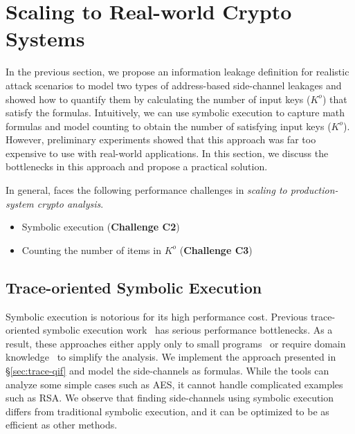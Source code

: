 \section{Scaling to Real-world Crypto Systems}
\label{sec:scala}

In the previous section, we propose an information leakage definition for
realistic attack scenarios to model two types of address-based side-channel
leakages and showed how to quantify them by calculating the number of input
keys ($K^o$) that satisfy the formulas. Intuitively, we can use
symbolic execution to capture math formulas and model counting
to obtain the number of satisfying input keys ($K^o$). However, preliminary
experiments showed that this approach was far too expensive to use with real-world
applications. In this section, we discuss the bottlenecks in
this approach and propose a practical solution.

In general, \tool{} faces the following performance challenges in
\emph{scaling to production-system crypto analysis}.
\begin{itemize}
      \item Symbolic execution (\textbf{Challenge C2})
      \item Counting the number of items in $K^o$ (\textbf{Challenge C3})
\end{itemize}

\subsection{Trace-oriented Symbolic Execution}
Symbolic execution is notorious for its high performance cost. 
Previous trace-oriented
symbolic execution
work~\cite{203878,Chattopadhyay:2017:QIL:3127041.3127044} has serious
performance bottlenecks. As a result, these approaches either apply only to
small programs~\cite{Chattopadhyay:2017:QIL:3127041.3127044} or require
domain knowledge~\cite{Wang:2007:NCD:1250662.1250723} to simplify the analysis. 
We implement
the approach presented in \S\ref{sec:trace-qif} and model the side-channels as
formulas. While the tools can analyze some simple cases such as AES, it cannot handle complicated examples such as RSA.
We observe that finding side-channels using symbolic execution differs from
traditional symbolic execution, and it can be optimized to be as efficient
as other methods.


